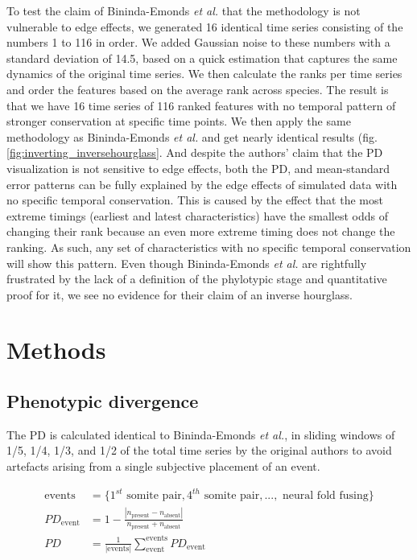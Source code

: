To test the claim of Bininda-Emonds \textit{et al.} that the methodology is not vulnerable to edge effects, we generated 16 identical time series consisting of the numbers 1 to 116 in order. We added Gaussian noise to these numbers with a standard deviation of 14.5, based on a quick estimation that captures the same dynamics of the original time series. We then calculate the ranks per time series and order the features based on the average rank across species. The result is that we have 16 time series of 116 ranked features with no temporal pattern of stronger conservation at specific time points. We then apply the same methodology as Bininda-Emonds \textit{et al.} and get nearly identical results (fig. \ref{fig:inverting_inversehourglass}. And despite the authors' claim that the PD visualization is not sensitive to edge effects, both the PD, and mean-standard error patterns can be fully explained by the edge effects of simulated data with no specific temporal conservation. This is caused by the effect that the most extreme timings (earliest and latest characteristics) have the smallest odds of changing their rank because an even more extreme timing does not change the ranking. As such, any set of characteristics with no specific temporal conservation will show this pattern. Even though Bininda-Emonds \textit{et al.} are rightfully frustrated by the lack of a definition of the phylotypic stage and quantitative proof for it, we see no evidence for their claim of an inverse hourglass. 

\newpage
\section{Methods}

\subsection{Phenotypic divergence}

The PD is calculated identical to Bininda-Emonds \textit{et al.},  in sliding windows of 1/5, 1/4, 1/3, and 1/2 of the total time series by the original authors to avoid artefacts arising from a single subjective placement of an event. 

\begin{align*}\label{eq:phenotypicdivergence}
    \text{events} &= \{1^{st}\text{ somite pair}, 4^{th}\text{ somite pair}, ...,\text{ neural fold fusing}\} \\ 
    PD_{\text{event}} &= 1 - \frac{|n_{\text{present}} - n_{\text{absent}}|}{n_{\text{present}} + n_{\text{absent}}} \\
    PD &= \frac{1}{|\text{events}|} \sum_{\text{event}}^{\text{events}} PD_{\text{event}}
\end{align*}

